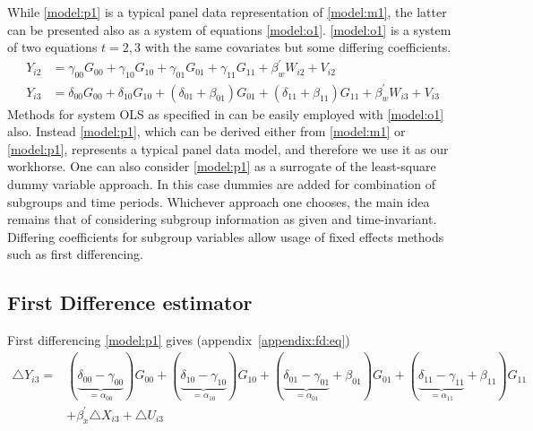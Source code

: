 \documentclass[12pt]{article}
\begin{document}
While \ref{model:p1} is a typical panel data representation of \ref{model:m1}, the latter can be presented also as a system of equations \ref{model:o1}. \ref{model:o1} is a system of two equations $t=2,3$ with the same covariates but some differing coefficients. 
\begin{equation}\tag{$O_1$}
	\label{model:o1}
	\begin{split}
		Y_{i2} &= \gamma_{00}G_{00} + \gamma_{10}G_{10} + \gamma_{01}G_{01}  + \gamma_{11}G_{11} + \beta_w^\prime W_{i2} + V_{i2}\\
		Y_{i3} &= \delta_{00}G_{00} + \delta_{10}G_{10} + (\delta_{01}+\beta_{01})G_{01}  + (\delta_{11}+ \beta_{11})G_{11} + \beta_w^\prime W_{i3} + V_{i3}
	\end{split}
\end{equation}
Methods for system OLS as specified in \cite{wooldridge2010econometric} can be easily employed with  \ref{model:o1} also. Instead \ref{model:p1}, which can be derived either from \ref{model:m1} or \ref{model:p1}, represents a typical panel data model, and therefore we use it as our workhorse. One can also consider \ref{model:p1} as a surrogate of the least-square dummy variable approach. In this case dummies are added for combination of subgroups and time periods. Whichever approach one chooses, the main idea remains that of considering subgroup information as given and time-invariant. Differing coefficients for subgroup variables allow usage of fixed effects methods such as first differencing.
 
\subsection{First Difference estimator}\label{subsec:fd}
First differencing \ref{model:p1} gives (appendix~\ref{appendix:fd:eq})
\begin{equation}
\tag{$FD_1$}
\label{eq:fd}
\begin{split}
\triangle Y_{i3} = & (\underset{=\alpha_{00}}{\underbrace{\delta_{00}-\gamma_{00}}})G_{00} + (\underset{=\alpha_{10}}{\underbrace{\delta_{10}-\gamma_{10}}}) G_{10} + (\underset{=\alpha_{01}}{\underbrace{\delta_{01}-\gamma_{01}}}+\beta_{01}) G_{01}  + 
 (\underset{=\alpha_{11}}{\underbrace{\delta_{11}-\gamma_{11}}}+\beta_{11}) G_{11} \\
 & + \beta_x^\prime \triangle X_{i3} + \triangle U_{i3}
\end{split}
\end{equation}
\end{document}
